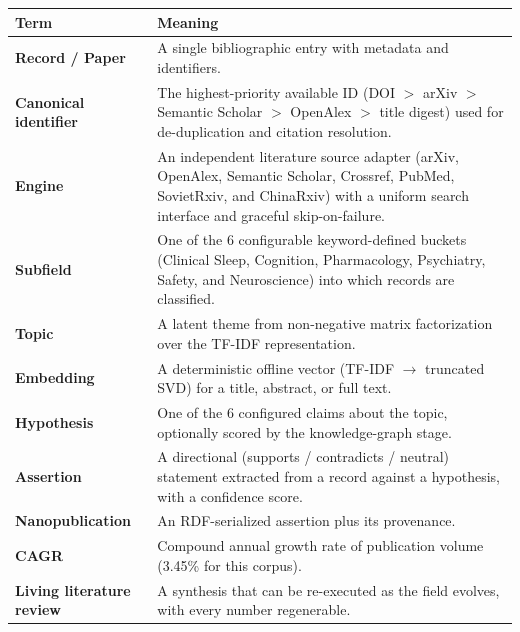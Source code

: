 \documentclass[
  english,
]{article}
\newcounter{none} %
\begin{document}
{\def\LTcaptype{none} %
\begin{longtable}[]{@{}
  >{\raggedright\arraybackslash}p{}
  >{\raggedright\arraybackslash}p{}@{}}
\toprule\noalign{}
\begin{minipage}[b]{\linewidth}\raggedright
Term
\end{minipage} & \begin{minipage}[b]{\linewidth}\raggedright
Meaning
\end{minipage} \\
\midrule\noalign{}
\endhead
\bottomrule\noalign{}
\endlastfoot
\textbf{Record / Paper} & A single bibliographic entry with metadata and
identifiers. \\
\textbf{Canonical identifier} & The highest-priority available ID (DOI
\(>\) arXiv \(>\) Semantic Scholar \(>\) OpenAlex \(>\) title digest)
used for de-duplication and citation resolution. \\
\textbf{Engine} & An independent literature source adapter (arXiv,
OpenAlex, Semantic Scholar, Crossref, PubMed, SovietRxiv, and ChinaRxiv)
with a uniform search interface and graceful skip-on-failure. \\
\textbf{Subfield} & One of the 6 configurable keyword-defined buckets
(Clinical Sleep, Cognition, Pharmacology, Psychiatry, Safety, and
Neuroscience) into which records are classified. \\
\textbf{Topic} & A latent theme from non-negative matrix factorization
over the TF-IDF representation. \\
\textbf{Embedding} & A deterministic offline vector (TF-IDF
\(\rightarrow\) truncated SVD) for a title, abstract, or full text. \\
\textbf{Hypothesis} & One of the 6 configured claims about the topic,
optionally scored by the knowledge-graph stage. \\
\textbf{Assertion} & A directional (supports / contradicts / neutral)
statement extracted from a record against a hypothesis, with a
confidence score. \\
\textbf{Nanopublication} & An RDF-serialized assertion plus its
provenance. \\
\textbf{CAGR} & Compound annual growth rate of publication volume
(3.45\% for this corpus). \\
\textbf{Living literature review} & A synthesis that can be re-executed
as the field evolves, with every number regenerable. \\
\end{longtable}
}
\end{document}
